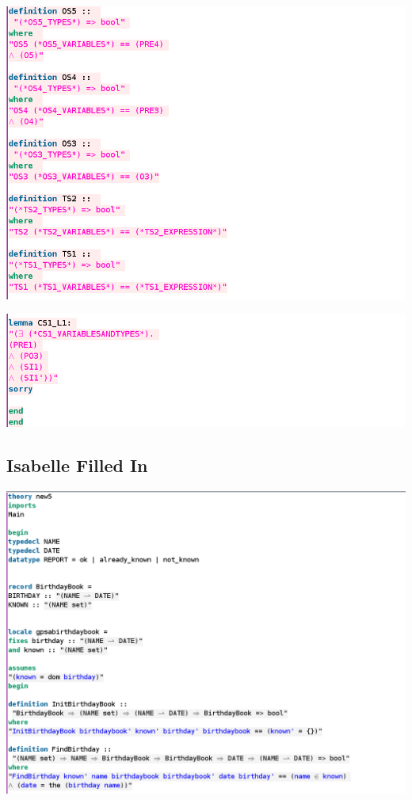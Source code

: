 \noindent \includegraphics[scale=0.5]{examples/bb/4imageb.png}

\noindent \includegraphics[scale=0.5]{examples/bb/4imagec.png}
%
\subsection{Isabelle Filled In}
\label{app:bb5}
\includegraphics[scale=0.4]{examples/bb/5imagea.png}

